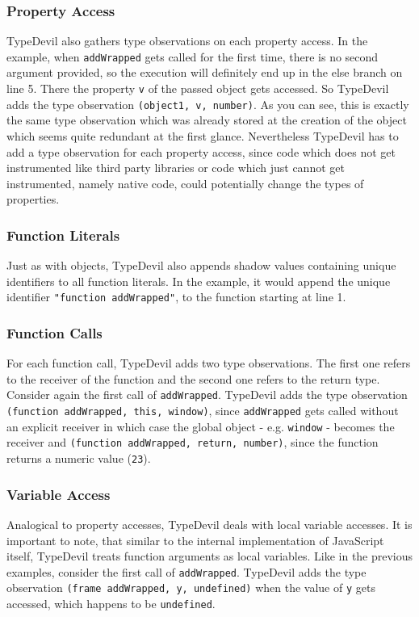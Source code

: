 \documentclass[runningheads,a4paper]{llncs}
\begin{document}
\subsubsection{Property Access}
TypeDevil also gathers type observations on each property access.
In the example, when \lstinline[columns=fixed]{addWrapped} gets called for the first time, there is no second argument provided, so the execution will definitely end up in the else branch on line 5. 
There the property \lstinline[columns=fixed]{v} of the passed object gets accessed.
So TypeDevil adds the type observation \lstinline[columns=fixed]{(object1, v, number)}.
As you can see, this is exactly the same type observation which was already stored at the creation of the object which seems quite redundant at the first glance. 
Nevertheless TypeDevil has to add a type observation for each property access, since code which does not get instrumented like third party libraries or code which just cannot get instrumented, namely native code, could potentially change the types of properties.

\subsubsection{Function Literals}
Just as with objects, TypeDevil also appends shadow values containing unique identifiers to all function literals.
In the example, it would append the unique identifier \lstinline[columns=fixed]{"function addWrapped"}, to the function starting at line 1.

\subsubsection{Function Calls}
For each function call, TypeDevil adds two type observations.
The first one refers to the receiver of the function and the second one refers to the return type.
Consider again the first call of \lstinline[columns=fixed]{addWrapped}.
TypeDevil adds the type observation \lstinline[columns=fixed]{(function addWrapped, this, window)}, since \lstinline[columns=fixed]{addWrapped} gets called without an explicit receiver in which case the global object - e.g. \lstinline[columns=fixed]{window} - becomes the receiver
and \lstinline[columns=fixed]{(function addWrapped, return, number)}, since the function returns a numeric value (\lstinline[columns=fixed]{23}).

\subsubsection{Variable Access}
Analogical to property accesses, TypeDevil deals with local variable accesses.
It is important to note, that similar to the internal implementation of JavaScript itself, TypeDevil treats function arguments as local variables.
Like in the previous examples, consider the first call of \lstinline[columns=fixed]{addWrapped}.
TypeDevil adds the type observation \lstinline[columns=fixed]{(frame addWrapped, y, undefined)} when the value of \lstinline[columns=fixed]{y} gets accessed, which happens to be \lstinline[columns=fixed]{undefined}.
\end{document}
